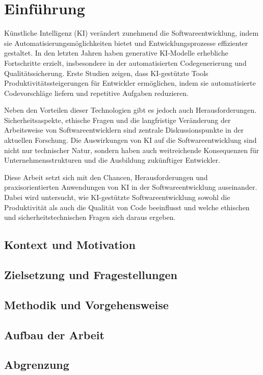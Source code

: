 \chapter{Einführung}
Künstliche Intelligenz (KI) verändert zunehmend die Softwareentwicklung, indem sie Automatisierungsmöglichkeiten bietet und Entwicklungsprozesse effizienter gestaltet. In den letzten Jahren haben generative KI-Modelle erhebliche Fortschritte erzielt, insbesondere in der automatisierten Codegenerierung und Qualitätssicherung. Erste Studien zeigen, dass KI-gestützte Tools Produktivitätssteigerungen für Entwickler ermöglichen, indem sie automatisierte Codevorschläge liefern und repetitive Aufgaben reduzieren.

Neben den Vorteilen dieser Technologien gibt es jedoch auch Herausforderungen. Sicherheitsaspekte, ethische Fragen und die langfristige Veränderung der Arbeitsweise von Softwareentwicklern sind zentrale Diskussionspunkte in der aktuellen Forschung. Die Auswirkungen von KI auf die Softwareentwicklung sind nicht nur technischer Natur, sondern haben auch weitreichende Konsequenzen für Unternehmensstrukturen und die Ausbildung zukünftiger Entwickler.

Diese Arbeit setzt sich mit den Chancen, Herausforderungen und praxisorientierten Anwendungen von KI in der Softwareentwicklung auseinander. Dabei wird untersucht, wie KI-gestützte Softwareentwicklung sowohl die Produktivität als auch die Qualität von Code beeinflusst und welche ethischen und sicherheitstechnischen Fragen sich daraus ergeben.
\newpage
\section{Kontext und Motivation}


\section{Zielsetzung und Fragestellungen}


\section{Methodik und Vorgehensweise}


\section{Aufbau der Arbeit}


\section{Abgrenzung}


